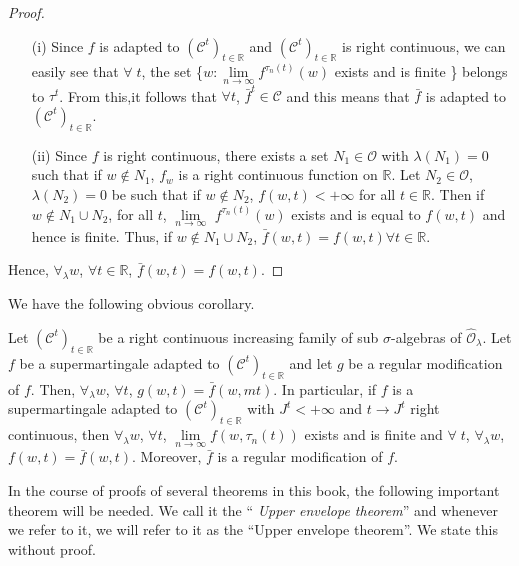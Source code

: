 \begin{proof}
\begin{itemize}
\item[{\rm (i)}] Since $f$ is adapted to
  $(\mathscr{C}^t)_{t\in\mathbb{R}}$ and $(\mathscr{C}^t)_{t \in
  \mathbb{R}}$ is right continuous, we can easily see that $\forall \;
  t$, the set \{$w : \lim\limits_{n \to \infty} f^{\tau_n(t)} (w)$
  exists and is finite \} belongs to $\tau^t$. 
From this,\pageoriginale it follows that $\forall
  t$, ${\bar{f}}^t \in \mathscr{C}$ and this means that $\bar{f}$ is
  adapted to $(\mathscr{C}^t)_{t \in \mathbb{R}}$.

\item[{\rm (ii)}] Since $f$ is right continuous, there exists a set
  $N_1 \in \mathscr{O}$ with $\lambda(N_1) = 0$ such that if $w
  \not\in N_1$, $f_w$ is a right continuous function on
  $\mathbb{R}$. Let $N_2 \in \mathscr{O}$, $\lambda(N_2) =0 $ be such
  that if $w \not\in N_2$, $f(w,t) < + \infty$ for all  $t \in
  \mathbb{R}$. Then if $w \not\in N_1 \cup N_2$, for all $t$,
  $\lim\limits_{n \to \infty}$ $f^{\tau_n(t)}(w)$ exists and is equal
  to $f(w,t)$ and hence is finite. Thus, if $w \not\in N_1 \cup N_2$,
  $\bar{f} (w,t) = f(w,t) \forall t\in\mathbb{R}$. 
\end{itemize}

Hence, $\forall_\lambda w$, $\forall t \in\mathbb{R}$, $\bar{f} (w,t)
= f(w,t)$. 
\end{proof}

We have the following obvious corollary.

\begin{corollary}\label{part2:chap4:coro67}
Let $(\mathscr{C}^t)_{t\in \mathbb{R}}$ be a right continuous
increasing family of sub $\sigma$-algebras of
$\hat{\mathscr{O}}_\lambda$. Let $f$ be a supermartingale adapted to
$(\mathscr{C}^t)_{t \in \mathbb{R}}$ and let $g$ be a regular
modification of $f$. Then, $\forall_\lambda w$, $\forall t $, $g (w,t)
= \bar{f} (w, mt)$. In particular, if $f$ is a supermartingale adapted
to $(\mathscr{C}^t)_{t \in \mathbb{R}}$ with $J^t < + \infty$ and $t
\to J^t$ right continuous, then $\forall_\lambda w$, $\forall t$,
$\lim\limits_{n \to \infty} f(w, \tau_n(t))$ exists and is finite and
$\forall \; t$, $\forall_\lambda w$, $f(w,t) =
\bar{f}(w,t)$. Moreover, $\bar{f}$ is a regular modification of $f$. 
\end{corollary}

In the course of proofs of several theorems in this book, the
following important theorem will be needed. We call it the ``{\em
  Upper envelope theorem}'' and whenever we refer to it, we will
refer to it as the ``Upper envelope theorem''. We state this without
proof. 

